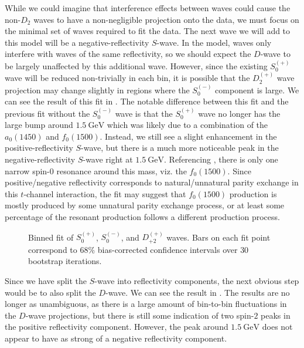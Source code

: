 While we could imagine that interference effects between waves could cause the non-$D_2$ waves to have a non-negligible projection onto the data, we must focus on the minimal set of waves required to fit the data. The next wave we will add to this model will be a negative-reflectivity $S$-wave. In the model, waves only interfere with waves of the same reflectivity, so we should expect the $D$-wave to be largely unaffected by this additional wave. However, since the existing $S_0^{(+)}$ wave will be reduced non-trivially in each bin, it is possible that the $D_2^{(+)}$ wave projection may change slightly in regions where the $S_0^{(-)}$ component is large. We can see the result of this fit in . The notable difference between this fit and the previous fit without the $S_0^{(-)}$ wave is that the $S_0^{(+)}$ wave no longer has the large bump around $\SI{1.5}{\giga\electronvolt}$ which was likely due to a combination of the $a_0(1450)$ and $f_0(1500)$. Instead, we still see a slight enhancement in the positive-reflectivity $S$-wave, but there is a much more noticeable peak in the negative-reflectivity $S$-wave right at $\SI{1.5}{\giga\electronvolt}$. Referencing , there is only one narrow spin-$0$ resonance around this mass, viz. the $f_0(1500)$. Since positive/negative reflectivity corresponds to natural/unnatural parity exchange in this $t$-channel interaction, the fit may suggest that $f_0(1500)$ production is mostly produced by some unnatural parity exchange process, or at least some percentage of the resonant production follows a different production process.

\begin{figure}
  \begin{center}
    
  \end{center}
  \caption{Binned fit of $S_{0}^{(+)}$, $S_{0}^{(-)}$, and $D_{+2}^{(+)}$ waves. Bars on each fit point correspond to $68\%$ bias-corrected confidence intervals over $ 30 $ bootstrap iterations.}\label{fig:binned-fit-chisqdof-3.0-Spn-D2p}
\end{figure}

Since we have split the $S$-wave into reflectivity components, the next obvious step would be to also split the $D$-wave. We can see the result in . The results are no longer as unambiguous, as there is a large amount of bin-to-bin fluctuations in the $D$-wave projections, but there is still some indication of two spin-$2$ peaks in the positive reflectivity component. However, the peak around $\SI{1.5}{\giga\electronvolt}$ does not appear to have as strong of a negative reflectivity component.

